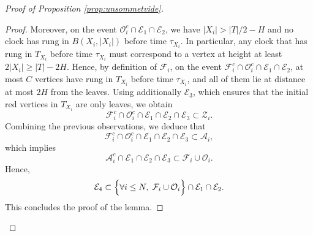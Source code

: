 \documentclass[10pt,a4paper]{amsart}
\newcommand{\Tf}{T}
\begin{document}
\begin{proof}[Proof of Proposition \ref{prop:unsommetvide}]
\begin{proof}
Moreover, on the event $\mathcal{O}_i^c \cap \mathcal{E}_1 \cap \mathcal{E}_2$, we have $|X_i|>|\Tf|/2-H$ and no clock has rung in $B(X_i,|X_i|)$ before time $\tau_{X_i}$. In particular, any clock that has rung in $\Tf_{X_i}$ before time $\tau_{X_i}$ must correspond to a vertex at height at least $2|X_i|\ge |\Tf|-2H$.
Hence, by definition of $\mathcal{F}_i$, on the event
$\mathcal{F}_i^c \cap \mathcal{O}_i^c \cap \mathcal{E}_1 \cap \mathcal{E}_2$,
at most $C$ vertices have rung in $\Tf_{X_i}$ before time $\tau_{X_i}$, and all of them lie at distance at most $2H$ from the leaves. Using additionally $\mathcal{E}_3$, which ensures that the initial red vertices in $\Tf_{X_i}$ are only leaves, we obtain
$$
\mathcal{F}_i^c \cap \mathcal{O}_i^c \cap \mathcal{E}_1 \cap \mathcal{E}_2 \cap \mathcal{E}_3
\subset \mathcal{Z}_i.
$$
Combining the previous observations, we deduce that
$$
\mathcal{F}_i^c \cap \mathcal{O}_i^c \cap \mathcal{E}_1 \cap \mathcal{E}_2 \cap \mathcal{E}_3
\subset \mathcal{A}_i,
$$
which implies
$$
\mathcal{A}_i^c \cap \mathcal{E}_1 \cap \mathcal{E}_2 \cap \mathcal{E}_3
\subset \mathcal{F}_i \cup \mathcal{O}_i.
$$
Hence,
$$
\mathcal{E}_4 \subset \Bigl\{\forall i \le N,\; \mathcal{F}_i \cup \mathcal{O}_i\Bigr\} \cap \mathcal{E}_1 \cap \mathcal{E}_2.
$$
This concludes the proof of the lemma.
\end{proof}


\end{proof}
\end{document}
